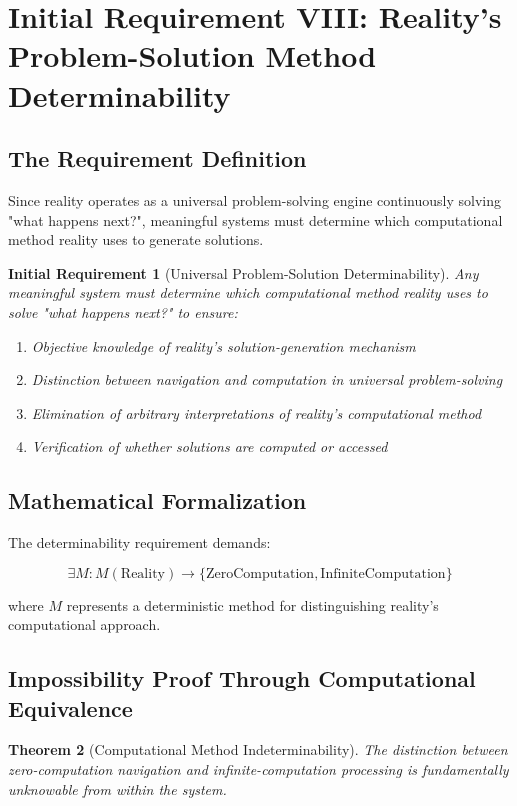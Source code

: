 \documentclass[12pt,a4paper]{article}
\newtheorem{theorem}{Theorem}[section]
\newtheorem{requirement}[theorem]{Initial Requirement}
\begin{document}
\section{Initial Requirement VIII: Reality's Problem-Solution Method Determinability}

\subsection{The Requirement Definition}

Since reality operates as a universal problem-solving engine continuously solving "what happens next?", meaningful systems must determine which computational method reality uses to generate solutions.

\begin{requirement}[Universal Problem-Solution Determinability]
Any meaningful system must determine which computational method reality uses to solve "what happens next?" to ensure:
\begin{enumerate}
\item Objective knowledge of reality's solution-generation mechanism
\item Distinction between navigation and computation in universal problem-solving
\item Elimination of arbitrary interpretations of reality's computational method
\item Verification of whether solutions are computed or accessed
\end{enumerate}
\end{requirement}

\subsection{Mathematical Formalization}

The determinability requirement demands:

$$\exists M: M(\text{Reality}) \to \{\text{ZeroComputation}, \text{InfiniteComputation}\}$$

where $M$ represents a deterministic method for distinguishing reality's computational approach.

\subsection{Impossibility Proof Through Computational Equivalence}

\begin{theorem}[Computational Method Indeterminability]
The distinction between zero-computation navigation and infinite-computation processing is fundamentally unknowable from within the system.
\end{theorem}
\end{document}

